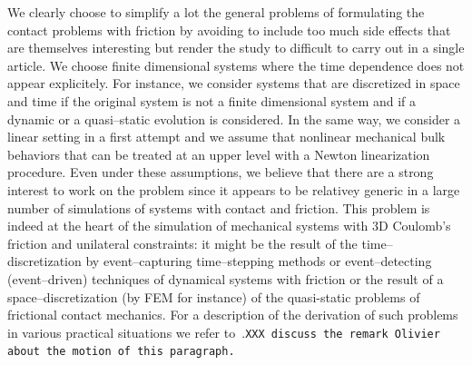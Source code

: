 We clearly choose to simplify a lot the general problems of formulating the contact problems with friction by avoiding to include too much side effects that are themselves interesting but render the study to difficult to carry out in a single article. We choose finite dimensional systems where the time dependence does not appear explicitely. For instance, we consider systems that are discretized in space and time if the original system is not a finite dimensional system and if a dynamic or a quasi--static evolution is considered. In the same way, we consider a linear setting in a first attempt and we assume that  nonlinear mechanical bulk behaviors that can be treated at an upper level with a Newton linearization procedure. Even under these assumptions, we believe that there are a strong interest to work on the problem since it appears to be relativey generic in a large number of simulations of systems with contact and friction. This problem is indeed at the heart of the simulation of mechanical systems with 3D Coulomb's friction and unilateral constraints: it might be the result of the time--discretization by event--capturing time--stepping methods or event--detecting (event--driven) techniques of dynamical systems with friction or the result of a space--discretization (by FEM for instance) of the quasi-static problems of frictional contact mechanics. For a description of the derivation of such problems in various practical situations we refer to~\cite{Acary.Brogliato2008,Acary.Cadoux2013}.{\tt XXX discuss the remark Olivier about the motion of this paragraph. }

